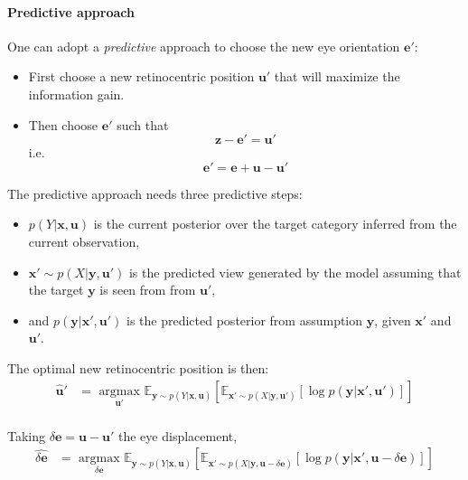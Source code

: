 \paragraph{Predictive approach}
One can adopt a \emph{predictive} approach to choose the new eye orientation $\boldsymbol{e}'$:
\begin{itemize}
	\item First choose a new retinocentric position $\boldsymbol{u}'$ that will maximize the  information gain.
	\item Then choose $\boldsymbol{e}'$ such that $$\boldsymbol{z} - \boldsymbol{e}' = \boldsymbol{u}'$$ i.e. $$\boldsymbol{e}' = \boldsymbol{e} + \boldsymbol{u} - \boldsymbol{u}'$$
\end{itemize}

The predictive approach needs three predictive steps:
\begin{itemize}
	\item $p(Y|\boldsymbol{x}, \boldsymbol{u})$ is the current posterior over the target category inferred from the current observation,
	\item $\boldsymbol{x}'\sim p(X|\boldsymbol{y},\boldsymbol{u}')$ is the predicted view generated by the model assuming that the target $\boldsymbol{y}$ is seen from from $\boldsymbol{u}'$,
	\item and $p(\boldsymbol{y}|\boldsymbol{x}', \boldsymbol{u}')$ is the predicted posterior from   assumption $\boldsymbol{y}$, given $\boldsymbol{x}'$ and $\boldsymbol{u}'$.
\end{itemize}

The optimal new retinocentric position is then:
\begin{align*}
\hat{\boldsymbol{u}}' &= \underset{\boldsymbol{u}' }{\text{ argmax }} 
 \mathbb{E}_{\boldsymbol{y}\sim p(Y|\boldsymbol{x}, \boldsymbol{u})}  
 \left[\mathbb{E}_{ \boldsymbol{x}' \sim p(X|\boldsymbol{y}, \boldsymbol{u}')}
 \left[\log p(\boldsymbol{y}|\boldsymbol{x}', \boldsymbol{u}')\right]\right]\\
\end{align*}

Taking $\delta \boldsymbol{e} = \boldsymbol{u} - \boldsymbol{u}'$ the eye displacement, 
\begin{align*}
\widehat{\delta\boldsymbol{e}} &= \underset{\delta\boldsymbol{e} }{\text{ argmax }} 
\mathbb{E}_{\boldsymbol{y}\sim p(Y|\boldsymbol{x}, \boldsymbol{u})}  
\left[\mathbb{E}_{ \boldsymbol{x}' \sim p(X|\boldsymbol{y}, \boldsymbol{u}- \delta \boldsymbol{e})}
\left[\log p(\boldsymbol{y}|\boldsymbol{x}', \boldsymbol{u}-\delta\boldsymbol{e})\right]\right]\\
\end{align*}

